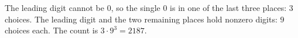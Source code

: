 The leading digit cannot be $0$, so the single $0$ is in one of the last three places: $3$ choices. The leading digit and the two remaining places hold nonzero digits: $9$ choices each. The count is $3\cdot9^3=\boxed{2187}$.
